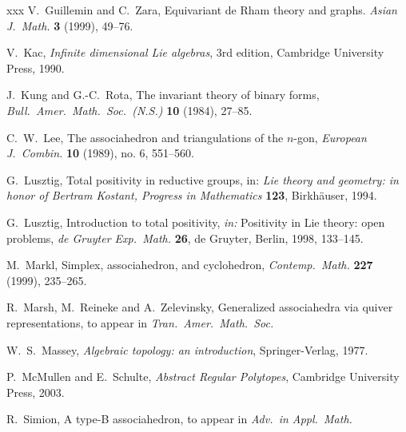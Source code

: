 \documentclass[letterpaper]{amsart}
\numberwithin{equation}{section}
\theoremstyle{definition}
\begin{document}
\begin{thebibliography}{xxx}
V.~Guillemin and C.~Zara, Equivariant de Rham theory and graphs. 
\textsl{Asian J.\ Math.} \textbf{3} (1999), 49--76. 
 
 
V.~Kac, {\sl Infinite dimensional Lie algebras}, 3rd edition, 
Cambridge University Press, 1990. 
 
 
J.~Kung and G.-C.~Rota, The invariant theory of binary forms, 
\textsl{Bull.\ Amer.\ Math.\ Soc.\ (N.S.)} {\bf 10} (1984), 27--85. 
 
C.~W.~Lee, 
The associahedron and triangulations of the $n$-gon, 
\textsl{European J.\ Combin.} \textbf{10} (1989), no. 6, 551--560. 
 
G.~Lusztig, Total positivity in reductive groups,
in: {\sl Lie theory and geometry:
in honor of Bertram Kostant, Progress in Mathematics} {\bf 123},
Birkh\"auser, 1994.

G.~Lusztig, Introduction to total positivity, 
{\it in:} Positivity in Lie theory: open problems, 
{\sl de Gruyter Exp.\ Math.} {\bf 26}, 
de Gruyter, Berlin, 1998, 133--145. 
 
M.~Markl, 
Simplex, associahedron, and cyclohedron, 
\textsl{Contemp.\ Math.} \textbf{227} (1999), 
235--265. 
 
R.~Marsh, M.~Reineke and A.~Zelevinsky, 
Generalized associahedra via quiver representations, 
to appear in \textsl{Tran.\ Amer.\ Math.\ Soc.}
 
W.~S.~Massey, 
\textsl{Algebraic topology: an introduction}, 
Springer-Verlag, %
1977. 
 
 
P.~McMullen and E.~Schulte, 
\textsl{Abstract Regular Polytopes}, Cambridge University Press, 2003. 
 
R.~Simion, 
A type-B associahedron, to appear in \textsl{Adv.\ in Appl.\ Math.}
 
 

\end{thebibliography}
\end{document}
